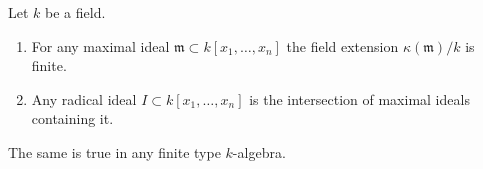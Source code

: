 %
\begin{theorem}
\label{theorem-nullstellensatz}
Let $k$ be a field.
\begin{enumerate}
\item
\label{item-finite-kappa}
For any maximal ideal $\mathfrak m \subset k[x_1, \ldots, x_n]$
the field extension $\kappa(\mathfrak m)/k$ is finite.
\item
\label{item-polynomial-ring-Jacobson}
Any radical ideal $I \subset k[x_1, \ldots, x_n]$
is the intersection of maximal ideals containing it.
\end{enumerate}
The same is true in any finite type $k$-algebra.
\end{theorem}

